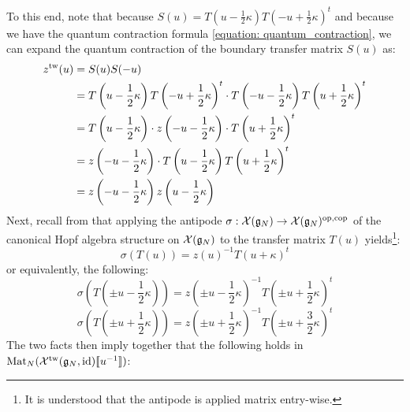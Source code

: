             To this end, note that because $S(u) = T\left(u - \frac12 \kappa\right) T\left(-u + \frac12 \kappa\right)^t$ and because we have the quantum contraction formula \eqref{equation: quantum_contraction}, we can expand the quantum contraction of the boundary transfer matrix $S(u)$ as:
                $$
                    \begin{aligned}
                        z^{\mathrm{tw}}(u) & = S(u) S(-u)
                        \\
                        & = T\left(u - \frac12 \kappa\right) T\left(-u + \frac12 \kappa\right)^t \cdot T\left(-u - \frac12 \kappa\right) T\left(u + \frac12 \kappa\right)^t
                        \\
                        & = T\left(u - \frac12 \kappa\right) \cdot z\left(-u - \frac12 \kappa\right) \cdot T\left(u + \frac12 \kappa\right)^t
                        \\
                        & = z\left(-u - \frac12 \kappa\right) \cdot T\left(u - \frac12 \kappa\right) T\left(u + \frac12 \kappa\right)^t
                        \\
                        & = z\left(-u - \frac12 \kappa\right) z\left(u - \frac12 \kappa\right)
                    \end{aligned}
                $$
            Next, recall from \cite[Section 2, p. 8]{arnaudon_molev_ragoucy_R_matrix_presentation_for_yangians} that applying the antipode $\sigma: \mathcal{X}(\mathfrak{g}_N) \to \mathcal{X}(\mathfrak{g}_N)^{\mathrm{op}, \mathrm{cop}}$ of the canonical Hopf algebra structure on $\mathcal{X}(\mathfrak{g}_N)$ to the transfer matrix $T(u)$ yields\footnote{It is understood that the antipode is applied matrix entry-wise.}:
                $$\sigma( T(u) ) = z(u)^{-1} T(u + \kappa)^t$$
            or equivalently, the following:
                $$\sigma\left( T\left( \pm u - \frac12\kappa \right) \right) = z\left( \pm u - \frac12\kappa \right)^{-1} T\left( \pm u + \frac12\kappa \right)^t$$
                $$\sigma\left( T\left( \pm u + \frac12\kappa \right) \right) = z\left( \pm u + \frac12\kappa \right)^{-1} T\left( \pm u + \frac32\kappa \right)^t$$
            The two facts then imply together that the following holds in $\mathrm{Mat}_N(\mathcal{X}^{\mathrm{tw}}(\mathfrak{g}_N, \mathrm{id})[\![u^{-1}]\!])$:
